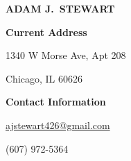 

\begin{center}

    \textbf{\uppercase{\Large Adam J.\ Stewart}}

\end{center}

\vspace{-12pt}

\begin{multicols}{2}

    \begin{flushleft}

        \textbf{Current Address}

        1340 W Morse Ave, Apt 208

        Chicago, IL 60626

    \end{flushleft}

    \columnbreak

    \begin{flushright}

        \textbf{Contact Information}

        \href{mailto:ajstewart426@gmail.com}{ajstewart426@gmail.com}

        (607) 972-5364

    \end{flushright}

\end{multicols}
